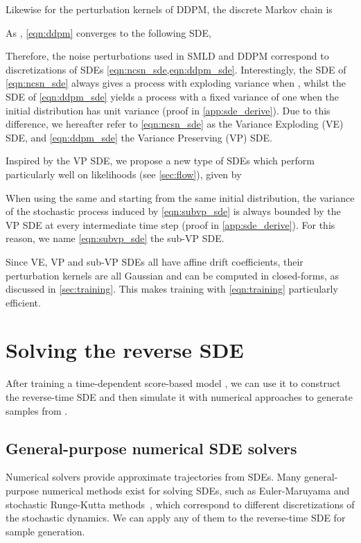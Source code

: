 \documentclass{article} \usepackage{iclr2021_conference,times}
\begin{document}
Likewise for the perturbation kernels  of DDPM, the discrete Markov chain is

As , \cref{eqn:ddpm} converges to the following SDE,


Therefore, the noise perturbations used in SMLD and DDPM correspond to discretizations of SDEs \cref{eqn:ncsn_sde,eqn:ddpm_sde}. Interestingly, the SDE of \cref{eqn:ncsn_sde} always gives a process with exploding variance when , whilst the SDE of \cref{eqn:ddpm_sde} yields a process with a fixed variance of one when the initial distribution has unit variance (proof in \cref{app:sde_derive}). Due to this difference, we hereafter refer to \cref{eqn:ncsn_sde} as the Variance Exploding (VE) SDE, and \cref{eqn:ddpm_sde} the Variance Preserving (VP) SDE. 

Inspired by the VP SDE, we propose a new type of SDEs which perform particularly well on likelihoods (see \cref{sec:flow}), given by

When using the same  and starting from the same initial distribution, the variance of the stochastic process induced by \cref{eqn:subvp_sde} is always bounded by the VP SDE at every intermediate time step (proof in \cref{app:sde_derive}). For this reason, we name \cref{eqn:subvp_sde} the sub-VP SDE.

Since VE, VP and sub-VP SDEs all have affine drift coefficients, their perturbation kernels  are all Gaussian and can be computed in closed-forms, as discussed in \cref{sec:training}. This makes training with \cref{eqn:training} particularly efficient. 







 \section{Solving the reverse SDE}
After training a time-dependent score-based model , we can use it to construct the reverse-time SDE and then simulate it with numerical approaches to generate samples from . 

\subsection{General-purpose numerical SDE solvers}

Numerical solvers provide approximate trajectories from SDEs. Many general-purpose numerical methods exist for solving SDEs, such as Euler-Maruyama and stochastic Runge-Kutta methods~\citep{kloeden2013numerical}, which correspond to different discretizations of the stochastic dynamics. We can apply any of them to the reverse-time SDE for sample generation. 
\end{document}
